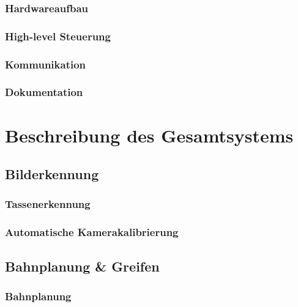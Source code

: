 \documentclass[de,ids]{fziartcl}
\begin{document}
\subsubsection{Hardwareaufbau}

\subsubsection{High-level Steuerung}

\subsubsection{Kommunikation}

\subsubsection{Dokumentation}


\section{Beschreibung des Gesamtsystems} %
\subsection{Bilderkennung}
\subsubsection{Tassenerkennung}
\label{4-1-1_gesamtsystem_bilderkennung_tassenerkennung}
\subsubsection{Automatische Kamerakalibrierung}
\label{4-1-2_gesamtsystem_bilderkennung_automatische_Kamerakalibrierung}
\subsection{Bahnplanung \& Greifen}
\subsubsection{Bahnplanung}
\end{document}
